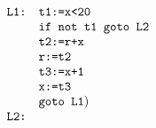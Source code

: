 \documentclass{jarticle}
\begin{document}
\[
 \begin{array}{ll}
  \verb|L1:| & \verb|t1:=x<20|\\
  & \verb|if not t1 goto L2|\\
  & \verb|t2:=r+x|\\
  & \verb|r:=t2|\\
  & \verb|t3:=x+1|\\
  & \verb|x:=t3|\\
  & \verb|goto L1|)\\
\verb|L2:| &
 \end{array}
\]
\end{document}
